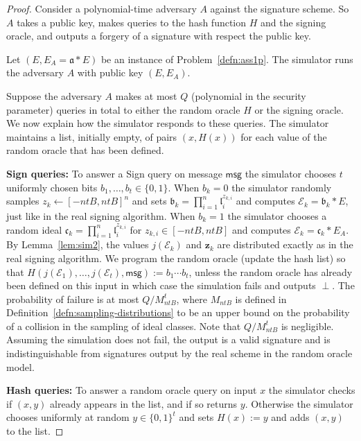 \documentclass{llncs}
\newcommand{\E}{\mathcal{E}}
\newcommand{\msg}{\mathsf{msg}}
\renewcommand{\a}{\mathfrak{a}}
\renewcommand{\b}{\mathfrak{b}}
\renewcommand{\c}{\mathfrak{c}}
\renewcommand{\l}{\mathfrak{l}}
\newcommand{\z}{\mathbf{z}}
\begin{document}
\begin{proof}
Consider a polynomial-time adversary $A$ against the signature scheme. So $A$ takes a public key, makes queries to the hash function $H$ and the signing oracle, and outputs a forgery of a signature with respect the public key.

Let $(E, E_A = \a * E )$ be an instance of Problem~\ref{defn:ass1p}.
The simulator runs the adversary $A$ with public key $(E, E_A)$.

Suppose the adversary $A$ makes at most $Q$ (polynomial in the security parameter) queries in total to either the random oracle $H$ or the signing oracle. We now explain how the simulator responds to these queries. The simulator maintains a list, initially empty, of pairs $(x, H(x))$ for each value of the random oracle that has been defined.

\vskip 0.1cm

\noindent \textbf{Sign queries:}
To answer a Sign query on message $\msg$ the simulator chooses 
$t$ uniformly chosen bits $b_1, \dots, b_t \in \{0,1\}$.
When $b_k = 0$ the simulator randomly samples $z_k \leftarrow [-ntB,ntB]^n$ and sets $\b_k = \prod_{i=1}^n \l_i^{z_{k,i}}$ and computes $\E_k = \b_k * E$, just like in the real signing algorithm.
When $b_k = 1$ the simulator chooses a random ideal $\c_k = \prod_{i=1}^n \l_i^{z_{k,i}}$ for $z_{k,i} \in [-ntB, ntB]$
and computes $\E_k = \c_k * E_A$.
By Lemma~\ref{lem:sim2}, the values $j( \E_k )$ and $\z_k$ are distributed exactly as in the real signing algorithm.
We program the random oracle (update the hash list) so that $H( j( \E_1), \dots, j(\E_t), \msg ) := b_1 \cdots b_t$, unless the random oracle has already been defined on this input in which case the simulation fails and outputs $\perp$.
The probability of failure is at most $Q/M_{ntB}^t$, 
where $M_{ntB}$ is defined in Definition~\ref{defn:sampling-distributions} to be an upper bound on the probability of a collision in the sampling of ideal classes.
Note that $Q/M_{ntB}^t$ is negligible.
Assuming the simulation does not fail, the output is a valid signature and is indistinguishable from signatures output by the real scheme in the random oracle model.

\vskip 0.1cm

\noindent \textbf{Hash queries:}
To answer a random oracle query on input $x$ the simulator checks if $(x,y)$ already appears in the list, and if so returns $y$. Otherwise the simulator chooses uniformly at random $y \in \{0,1\}^t$ and sets $H(x) := y$ and adds $(x,y)$ to the list.


\end{proof}
\end{document}

